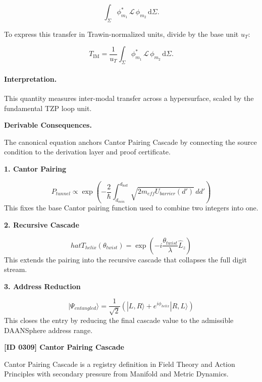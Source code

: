 \begin{equation}
\int_{\Sigma}
\phi_{m_1}^{*}
\,\mathcal{L}\,
\phi_{m_2}
\,\mathrm{d}\Sigma .
\end{equation}

To express this transfer in Trawin-normalized units, divide by the base unit $u_T$:

\begin{equation}
T_{\mathrm{IM}}
=
\frac{1}{u_T}
\int_{\Sigma}
\phi_{m_1}^{*}
\,\mathcal{L}\,
\phi_{m_2}
\,\mathrm{d}\Sigma .
\end{equation}

\paragraph{Interpretation.}
This quantity measures inter-modal transfer across a hypersurface, scaled by the fundamental TZP loop unit.

\par\vspace{0.35em}
\noindent\textbf{Derivable Consequences.}\quad
\begingroup
\footnotesize
\raggedright
The canonical equation anchors Cantor Pairing Cascade by connecting the source condition to the derivation layer and proof certificate.
\par\endgroup

\noindent\textbf{1. Cantor Pairing}\par
\[
P_{tunnel} \propto \exp\left(-\frac{2}{\hbar}\int_{d_{min}}^{d_{bolt}} \sqrt{2m_{eff}U_{barrier}(d')} \, dd'\right)
\]
\noindent This fixes the base Cantor pairing function used to combine two integers into one.\par
\noindent\textbf{2. Recursive Cascade}\par
\[
hat{T}_{helix}(\theta_{twist}) = \exp\left(-i\frac{\theta_{twist}}{\lambda}\hat{L}_z\right)
\]
\noindent This extends the pairing into the recursive cascade that collapses the full digit stream.\par
\noindent\textbf{3. Address Reduction}\par
\[
|\Psi_{entangled}\rangle = \frac{1}{\sqrt{2}}\left(|L,R\rangle + e^{i\phi_{helix}}|R,L\rangle\right)
\]
\noindent This closes the entry by reducing the final cascade value to the admissible DAANSphere address range.\par

\clearpage
\noindent\textbf{[ID 0309] Cantor Pairing Cascade}\par
\vspace{0.35em}
\begingroup\small
{}
Cantor Pairing Cascade is a registry definition in Field Theory and Action Principles with secondary pressure from Manifold and Metric Dynamics.

